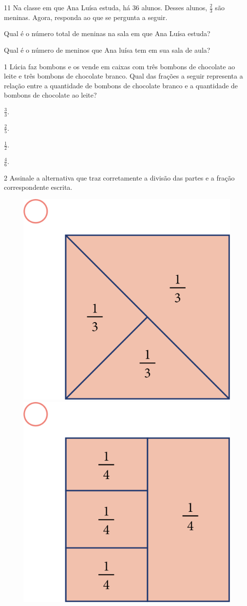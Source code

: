 \num{11} Na classe em que Ana Luísa estuda, há 36 alunos. Desses alunos, $\frac{2}{3}$
são meninas. Agora, responda ao que se pergunta a seguir.

\begin{escolha}
\item
  Qual é o número total de meninas na sala em que Ana Luísa estuda?


\item
  Qual é o número de meninos que Ana luísa tem em sua sala de aula?

\end{escolha}


\num{1} Lúcia faz bombons e os vende em caixas com três bombons de chocolate ao leite e três bombons de chocolate branco. Qual das frações a seguir representa a relação entre a quantidade de
bombons de chocolate branco e a quantidade de bombons de chocolate ao leite?

\begin{multicols}{2}
\begin{escolha}
\item
  $\frac{3}{3}$.

\item
  $\frac{2}{5}$.

\item
  $\frac{1}{2}$.

\item
  $\frac{4}{6}$.
\end{escolha}
\end{multicols}

\pagebreak
\num{2} Assinale a alternativa que traz corretamente a divisão das partes e a
fração correspondente escrita.

\begin{figure}[htpb!]
\includegraphics[width=.3\textwidth]{media/image66.png}
\includegraphics[width=.3\textwidth]{media/image67.png}
\end{figure}

